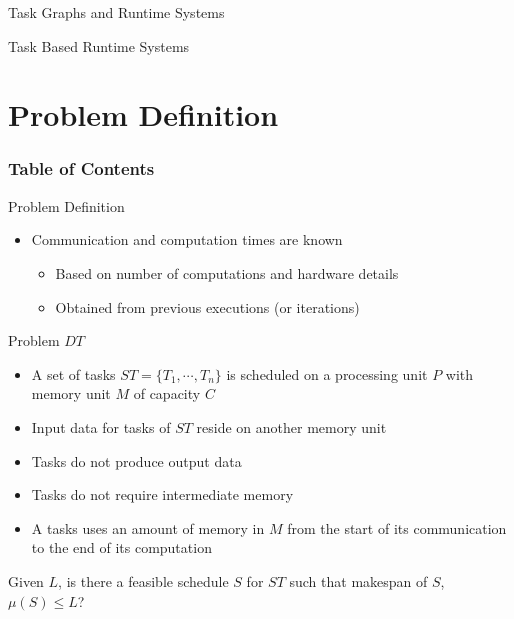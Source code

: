 \documentclass[mathserif,hyperref={pdfpagemode=FullScreen}]{beamer}
\begin{document}
\begin{frame}{Task Graphs and Runtime Systems}
\begin{block}{Task Based Runtime Systems}
\begin{itemize}
\end{itemize}
\end{block}
\end{frame}



\section{Problem Definition}

\begin{frame}
\frametitle{Table of Contents}
\tableofcontents[currentsection, subsectionstyle=shaded]
\end{frame}

\begin{frame}{Problem Definition}
\begin{itemize}
	\item Communication and computation times are known
	\begin{itemize}
		\item Based on number of computations and hardware details
		\item Obtained from previous executions (or iterations)
	\end{itemize}
\end{itemize}
\begin{block}{Problem $DT$ }
	\begin{itemize}
		\item A set of tasks $ST=\{T_1, \cdots, T_n\}$ is scheduled on a processing unit $P$ with
		memory unit $M$ of capacity $C$
		\item Input data for tasks of $ST$
		reside on another memory unit
		\item Tasks do not produce output data
		\item Tasks do not require intermediate memory
		\item A tasks uses an amount of memory in $M$ from the
		start of its communication to the end of its computation
	\end{itemize}
\noindent Given $L$, is there a feasible schedule $S$ for $ST$ such that
makespan of $S$, $\mu(S) \le L$?
\end{block}

\end{frame}
\end{document}
